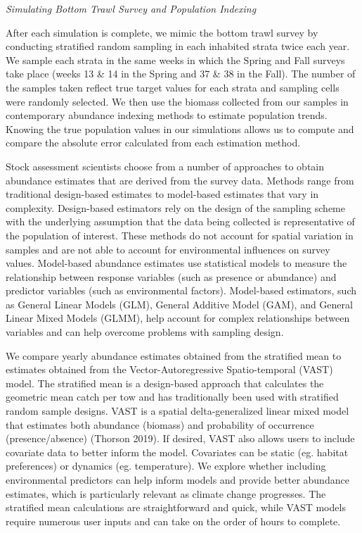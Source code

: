 \documentclass[
  12pt,
]{article}
\begin{document}
\emph{Simulating Bottom Trawl Survey and Population Indexing}

After each simulation is complete, we mimic the bottom trawl survey by conducting stratified random sampling in each inhabited strata twice each year. We sample each strata in the same weeks in which the Spring and Fall surveys take place (weeks 13 \& 14 in the Spring and 37 \& 38 in the Fall). The number of the samples taken reflect true target values for each strata and sampling cells were randomly selected. We then use the biomass collected from our samples in contemporary abundance indexing methods to estimate population trends. Knowing the true population values in our simulations allows us to compute and compare the absolute error calculated from each estimation method.

Stock assessment scientists choose from a number of approaches to obtain abundance estimates that are derived from the survey data. Methods range from traditional design-based estimates to model-based estimates that vary in complexity. Design-based estimators rely on the design of the sampling scheme with the underlying assumption that the data being collected is representative of the population of interest. These methods do not account for spatial variation in samples and are not able to account for environmental influences on survey values. Model-based abundance estimates use statistical models to measure the relationship between response variables (such as presence or abundance) and predictor variables (such as environmental factors). Model-based estimators, such as General Linear Models (GLM), General Additive Model (GAM), and General Linear Mixed Models (GLMM), help account for complex relationships between variables and can help overcome problems with sampling design.

We compare yearly abundance estimates obtained from the stratified mean to estimates obtained from the Vector-Autoregressive Spatio-temporal (VAST) model. The stratified mean is a design-based approach that calculates the geometric mean catch per tow and has traditionally been used with stratified random sample designs. VAST is a spatial delta-generalized linear mixed model that estimates both abundance (biomass) and probability of occurrence (presence/absence) (Thorson 2019). If desired, VAST also allows users to include covariate data to better inform the model. Covariates can be static (eg. habitat preferences) or dynamics (eg. temperature). We explore whether including environmental predictors can help inform models and provide better abundance estimates, which is particularly relevant as climate change progresses. The stratified mean calculations are straightforward and quick, while VAST models require numerous user inputs and can take on the order of hours to complete.
\end{document}
